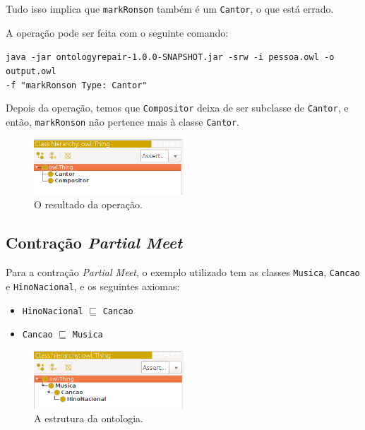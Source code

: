 Tudo isso implica que \texttt{markRonson} também é um \texttt{Cantor}, o que está errado. 

A operação pode ser feita com o seguinte comando:

\begin{small}
	\texttt{java -jar ontologyrepair-1.0.0-SNAPSHOT.jar -srw -i pessoa.owl -o output.owl \\ -f "markRonson Type: Cantor"}
\end{small}

Depois da operação, temos que \texttt{Compositor} deixa de ser subclasse de \texttt{Cantor}, e então, \texttt{markRonson} não pertence mais à classe \texttt{Cantor}.

\begin{figure}[H]
	\centering
	\includegraphics[width=0.5\textwidth]{Capitulos/Implementacao/srw3.png}
	\caption{O resultado da operação.}
\end{figure}

\subsection{Contração \textit{Partial Meet}}

Para a contração \textit{Partial Meet}, o exemplo utilizado tem as classes \texttt{Musica}, \texttt{Cancao} e \texttt{HinoNacional}, e os seguintes axiomas: 

\begin{itemize}
	\item \texttt{HinoNacional} $ \sqsubseteq $ \texttt{Cancao}
	\item \texttt{Cancao} $ \sqsubseteq $ \texttt{Musica}
\end{itemize}

\begin{figure}[H]
	\centering
	\includegraphics[width=0.5\textwidth]{Capitulos/Implementacao/cpm1.png}
	\caption{A estrutura da ontologia.}
\end{figure}

